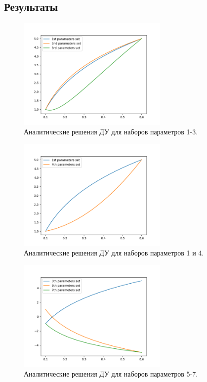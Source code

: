 \documentclass[12pt]{article}%
\begin{document}
\subsection{Результаты}
\begin{figure}[!h]
    \centering
    \includegraphics[width=0.65\textwidth]{sets1-3.png}
    \caption{Аналитические решения ДУ для наборов параметров 1-3.}
\end{figure}

\begin{figure}[!h]
    \centering
    \includegraphics[width=0.65\textwidth]{sets14.png}
    \caption{Аналитические решения ДУ для наборов параметров 1 и 4.}
\end{figure}

\begin{figure}[!h]
    \centering
    \includegraphics[width=0.65\textwidth]{sets5-7.png}
    \caption{Аналитические решения ДУ для наборов параметров 5-7.}
\end{figure}
\end{document}

